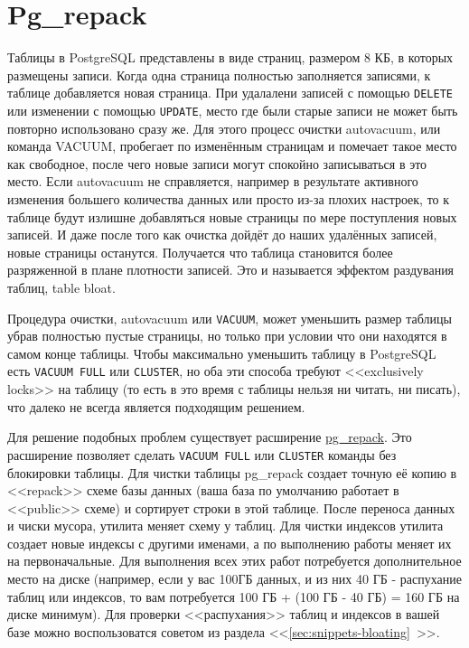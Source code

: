 \section{Pg\_repack}

Таблицы в PostgreSQL представлены в виде страниц, размером 8 КБ, в которых размещены записи. Когда одна страница полностью заполняется записями, к таблице добавляется новая страница. При удалалени записей с помощью \lstinline!DELETE! или изменении с помощью \lstinline!UPDATE!, место где были старые записи не может быть повторно использовано сразу же. Для этого процесс очистки autovacuum, или команда VACUUM, пробегает по изменённым страницам и помечает такое место как свободное, после чего новые записи могут спокойно записываться в это место. Если autovacuum не справляется, например в результате активного изменения большего количества данных или просто из-за плохих настроек, то к таблице будут излишне добавляться новые страницы по мере поступления новых записей. И даже после того как очистка дойдёт до наших удалённых записей, новые страницы останутся. Получается что таблица становится более разряженной в плане плотности записей. Это и называется эффектом раздувания таблиц, table bloat.

Процедура очистки, autovacuum или \lstinline!VACUUM!, может уменьшить размер таблицы убрав полностью пустые страницы, но только при условии что они находятся в самом конце таблицы. Чтобы максимально уменьшить таблицу в PostgreSQL есть \lstinline!VACUUM FULL! или \lstinline!CLUSTER!, но оба эти способа требуют <<exclusively locks>> на таблицу (то есть в это время с таблицы нельзя ни читать, ни писать), что далеко не всегда является подходящим решением.

Для решение подобных проблем существует расширение \href{http://reorg.github.io/pg\_repack/}{pg\_repack}. Это расширение позволяет сделать \lstinline!VACUUM FULL! или \lstinline!CLUSTER! команды без блокировки таблицы. Для чистки таблицы pg\_repack создает точную её копию в <<repack>> схеме базы данных (ваша база по умолчанию работает в <<public>> схеме) и сортирует строки в этой таблице. После переноса данных и чиски мусора, утилита меняет схему у таблиц. Для чистки индексов утилита создает новые индексы с другими именами, а по выполнению работы меняет их на первоначальные. Для выполнения всех этих работ потребуется дополнительное место на диске (например, если у вас 100ГБ данных, и из них 40 ГБ - распухание таблиц или индексов, то вам потребуется 100 ГБ + (100 ГБ - 40 ГБ) = 160 ГБ на диске минимум). Для проверки <<распухания>> таблиц и индексов в вашей базе можно воспользоватся советом из раздела <<\ref{sec:snippets-bloating}~>>.

